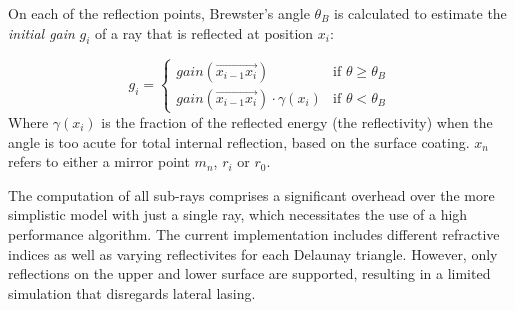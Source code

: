 On each of the reflection points, Brewster's angle $\theta_{B}$ is calculated to
estimate the \emph{initial gain} $g_i$ of a ray that is reflected at position
$x_i$:

\begin{equation}
\label{eq:gain_reflection}
  g_i = 
  \begin{cases}
    gain(\overrightarrow{x_{i-1}x_i}) & \text{if } \theta \ge \theta_{B}  \\
    gain(\overrightarrow{x_{i-1}x_i}) \cdot \gamma(x_i) & \text{if } \theta < \theta_{B}   
  \end{cases}
\end{equation}
Where $\gamma(x_i)$ is the fraction of the reflected energy (the reflectivity)
when the angle is too acute for total internal reflection, based on the surface
coating. $x_n$ refers to
either a mirror point $m_n$, $r_i$ or $r_0$.

The computation of all sub-rays comprises a significant overhead over the more
simplistic model with just a single ray, which necessitates the use of a high
performance algorithm.  The current implementation includes different refractive
indices as well as varying reflectivites for each Delaunay triangle. However,
only reflections on the upper and lower surface are supported, resulting in a
limited simulation that disregards lateral lasing. 
